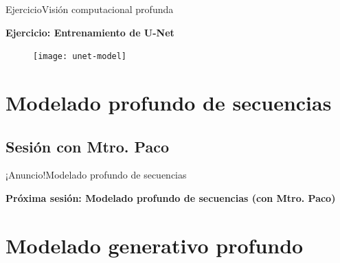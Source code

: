 \documentclass[10pt,border=3pt,tikz]{beamer}
\begin{document}
    {
        
    }
    
    \begin{frame}{Ejercicio}{Visión computacional profunda}
        \begin{center}
            {\Large \textbf{Ejercicio: Entrenamiento de U-Net}}
        \end{center}
        \begin{figure}
            \centering
            \texttt{[image: unet-model]}
        \end{figure}
    \end{frame}
    
    \section{Modelado profundo de secuencias}
    
    
    \begin{frame}
        \sectionpage
    \end{frame}
    
    \subsection{Sesión con Mtro. Paco}
    
    \begin{frame}{¡Anuncio!}{Modelado profundo de secuencias}
        \begin{center}
            {\Large \textbf{Próxima sesión: Modelado profundo de secuencias (con Mtro. Paco)}}
        \end{center}
    \end{frame}
    
    
    \section{Modelado generativo profundo}
    
    
    \begin{frame}
        \sectionpage
    \end{frame}
    
\end{document}
